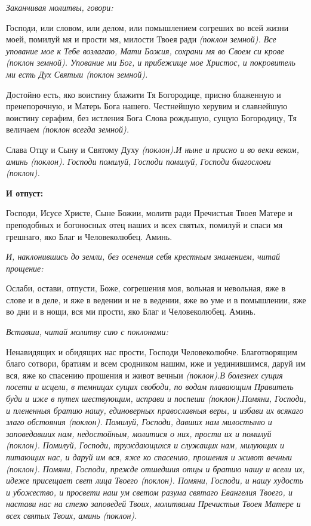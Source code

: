 \itshape Заканчивая молитвы, говори:\normalfont{}


Господи, или словом, или делом, или помышлением согреших во всей жизни моей, помилуй мя и прости мя, милости Твоея ради \itshape (поклон земной)\normalfont{}. Все упование мое к Тебе возлагаю, Мати Божия, сохрани мя во Своем си крове \itshape (поклон земной)\normalfont{}. Упование ми Бог, и прибежище мое Христос, и покровитель ми есть Дух Святыи \itshape (поклон земной)\normalfont{}.


Достойно есть, яко воистину блажити Тя Богородице, присно блаженную и пренепорочную, и Матерь Бога нашего. Честнейшую херувим и славнейшую воистину серафим, без истления Бога Слова рождьшую, сущую Богородицу, Тя величаем \itshape (поклон всегда земной)\normalfont{}.


Слава Отцу и Сыну и Святому Духу \itshape (поклон)\normalfont{}.И ныне и присно и во веки веком, аминь \itshape (поклон)\normalfont{}. Господи помилуй, Господи помилуй, Господи благослови \itshape (поклон)\normalfont{}.





\bfseries И отпуст:\normalfont{}


Господи, Исусе Христе, Сыне Божии, молитв ради Пречистыя Твоея Матере и преподобных и богоносных отец наших и всех святых, помилуй и спаси мя грешнаго, яко Благ и Человеколюбец. Аминь.


\itshape И, наклонившись до земли, без осенения себя крестным знамением, читай прощение:\normalfont{}


Ослаби, остави, отпусти, Боже, согрешения моя, вольная и невольная, яже в слове и в деле, и яже в ведении и не в ведении, яже во уме и в помышлении, яже во дни и в нощи, вся ми прости, яко Благ и Человеколюбец. Аминь.


\itshape Вставши, читай молитву сию с поклонами:\normalfont{}


Ненавидящих и обидящих нас прости, Господи Человеколюбче. Благотворящим благо сотвори, братиям и всем сродником нашим, иже и уединившимся, даруй им вся, яже ко спасению прошения и живот вечныи \itshape (поклон)\normalfont{}.В болезнех сущия посети и исцели, в темницах сущих свободи, по водам плавающим Правитель буди и иже в путех шествующим, исправи и поспеши \itshape (поклон)\normalfont{}.Помяни, Господи, и плененныя братию нашу, единоверных православныя веры, и избави их всякаго злаго обстояния \itshape (поклон)\normalfont{}. Помилуй, Господи, давших нам милостыню и заповедавших нам, недостойным, молитися о них, прости их и помилуй \itshape (поклон)\normalfont{}. Помилуй, Господи, труждающихся и служащих нам, милующих и питающих нас, и даруй им вся, яже ко спасению, прошения и живот вечныи \itshape (поклон)\normalfont{}. Помяни, Господи, прежде отшедшия отцы и братию нашу и всели их, идеже присещает свет лица Твоего \itshape (поклон)\normalfont{}. Помяни, Господи, и нашу худость и убожество, и просвети наш ум светом разума святаго Евангелия Твоего, и настави нас на стезю заповедей Твоих, молитвами Пречистыя Твоея Матере и всех святых Твоих, аминь \itshape (поклон)\normalfont{}.



